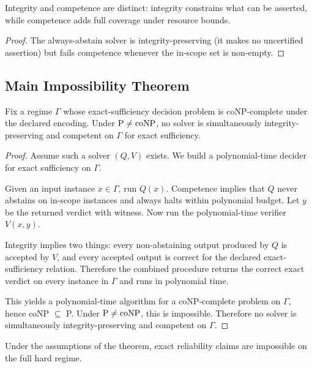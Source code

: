 \begin{proposition}
Integrity and competence are distinct: integrity constrains what can be asserted, while competence adds full coverage under resource bounds.
\end{proposition}

\begin{proof}
The always-abstain solver is integrity-preserving (it makes no uncertified assertion) but fails competence whenever the in-scope set is non-empty.
\end{proof}

\subsection{Main Impossibility Theorem}

\begin{theorem}\label{thm:integrity-resource}
Fix a regime $\Gamma$ whose exact-sufficiency decision problem is coNP-complete under the declared encoding. Under $\mathrm{P}\neq\mathrm{coNP}$, no solver is simultaneously integrity-preserving and competent on $\Gamma$ for exact sufficiency.
\end{theorem}

\begin{proof}
Assume such a solver $(Q,V)$ exists. We build a polynomial-time decider for exact sufficiency on $\Gamma$.

Given an input instance $x\in \Gamma$, run $Q(x)$. Competence implies that $Q$ never abstains on in-scope instances and always halts within polynomial budget. Let $y$ be the returned verdict with witness. Now run the polynomial-time verifier $V(x,y)$.

Integrity implies two things: every non-abstaining output produced by $Q$ is accepted by $V$, and every accepted output is correct for the declared exact-sufficiency relation. Therefore the combined procedure returns the correct exact verdict on every instance in $\Gamma$ and runs in polynomial time.

This yields a polynomial-time algorithm for a coNP-complete problem on $\Gamma$, hence coNP $\subseteq$ P. Under $\mathrm{P}\neq\mathrm{coNP}$, this is impossible. Therefore no solver is simultaneously integrity-preserving and competent on $\Gamma$.
\end{proof}

\begin{corollary}
Under the assumptions of the theorem, exact reliability claims are impossible on the full hard regime.
\end{corollary}

